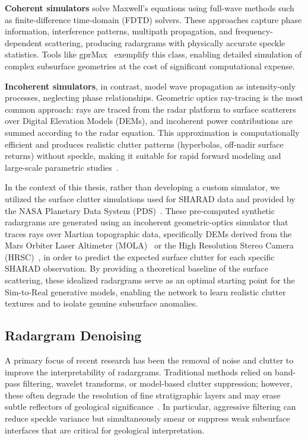 \textbf{Coherent simulators} solve Maxwell's equations using full-wave methods such as finite-difference time-domain (FDTD) solvers.
These approaches capture phase information, interference patterns, multipath propagation, and frequency-dependent scattering, producing radargrams with physically accurate speckle statistics.
Tools like gprMax~\cite{Warren_2016} exemplify this class, enabling detailed simulation of complex subsurface geometries at the cost of significant computational expense.

\textbf{Incoherent simulators}, in contrast, model wave propagation as intensity-only processes, neglecting phase relationships.
Geometric optics ray-tracing is the most common approach: rays are traced from the radar platform to surface scatterers over Digital Elevation Models (DEMs), and incoherent power contributions are summed according to the radar equation.
This approximation is computationally efficient and produces realistic clutter patterns (hyperbolas, off-nadir surface returns) without speckle, making it suitable for rapid forward modeling and large-scale parametric studies~\cite{Seu_2007}.

In the context of this thesis, rather than developing a custom simulator, we utilized the surface clutter simulations used for SHARAD data and provided by the NASA Planetary Data System (PDS)~\cite{Choudhary_2016}.
These pre-computed synthetic radargrams are generated using an incoherent geometric-optics simulator that traces rays over Martian topographic data, specifically DEMs derived from the Mars Orbiter Laser Altimeter (MOLA)~\cite{Smith_2001} or the High Resolution Stereo Camera (HRSC)~\cite{Neukum_2004}, in order to predict the expected surface clutter for each specific SHARAD observation.
By providing a theoretical baseline of the surface scattering, these idealized radargrams serve as an optimal starting point for the Sim-to-Real generative models, enabling the network to learn realistic clutter textures and to isolate genuine subsurface anomalies.

\subsection{Radargram Denoising}
A primary focus of recent research has been the removal of noise and clutter to improve the interpretability of radargrams.
Traditional methods relied on band-pass filtering, wavelet transforms, or model-based clutter suppression; however, these often degrade the resolution of fine stratigraphic layers and may erase subtle reflectors of geological significance~\cite{Daniels_2004,yebasse2025advances}.
In particular, aggressive filtering can reduce speckle variance but simultaneously smear or suppress weak subsurface interfaces that are critical for geological interpretation.

